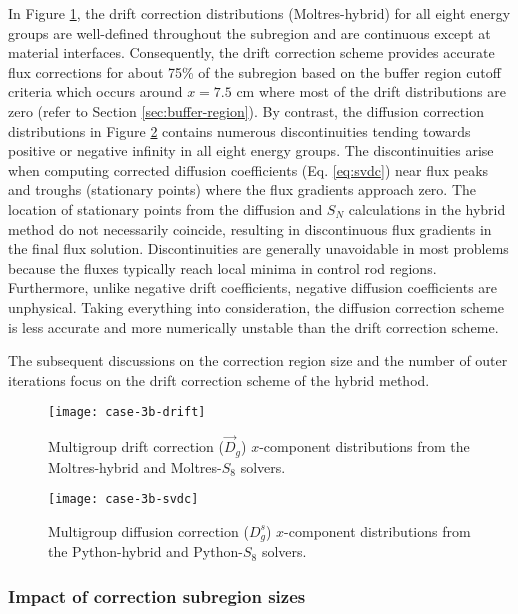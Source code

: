 In Figure \ref{fig:3b-drift}, the drift
correction distributions (Moltres-hybrid) for all eight energy groups are well-defined throughout
the subregion and are continuous except at material interfaces. Consequently, the drift correction
scheme provides accurate flux corrections for about 75\% of the subregion based on the buffer
region cutoff criteria which occurs around $x=7.5$ cm where most of the drift distributions are
zero (refer to Section \ref{sec:buffer-region}). By contrast, the diffusion correction
distributions in Figure \ref{fig:3b-svdc} contains numerous discontinuities tending towards
positive or negative infinity in all eight energy groups. The discontinuities arise when
computing corrected diffusion coefficients (Eq. \ref{eq:svdc}) near flux peaks and troughs
(stationary points) where the flux gradients approach zero. The location of stationary points from
the diffusion and $S_N$ calculations in the hybrid method do not necessarily coincide, resulting in
discontinuous flux gradients in the final flux solution. Discontinuities are generally unavoidable
in most problems because the fluxes typically reach local minima in control rod regions.
Furthermore, unlike negative drift coefficients, negative diffusion coefficients are unphysical.
Taking everything into consideration, the diffusion correction scheme is less accurate and more
numerically unstable than the drift correction scheme.

The subsequent discussions on the correction region size and the number of outer
iterations focus on the drift correction scheme of the hybrid method.

\begin{figure}[p]
  \centering
  \texttt{[image: case-3b-drift]}
  \caption{Multigroup drift correction ($\vec{D}_g$) $x$-component distributions from the
  Moltres-hybrid and Moltres-$S_8$ solvers.}
  \label{fig:3b-drift}
\end{figure}

\begin{figure}[p]
  \centering
  \texttt{[image: case-3b-svdc]}
  \caption{Multigroup diffusion correction ($D^s_g$) $x$-component distributions from the
    Python-hybrid and Python-$S_8$ solvers.}
  \label{fig:3b-svdc}
\end{figure}

\FloatBarrier

\subsubsection{Impact of correction subregion sizes}

